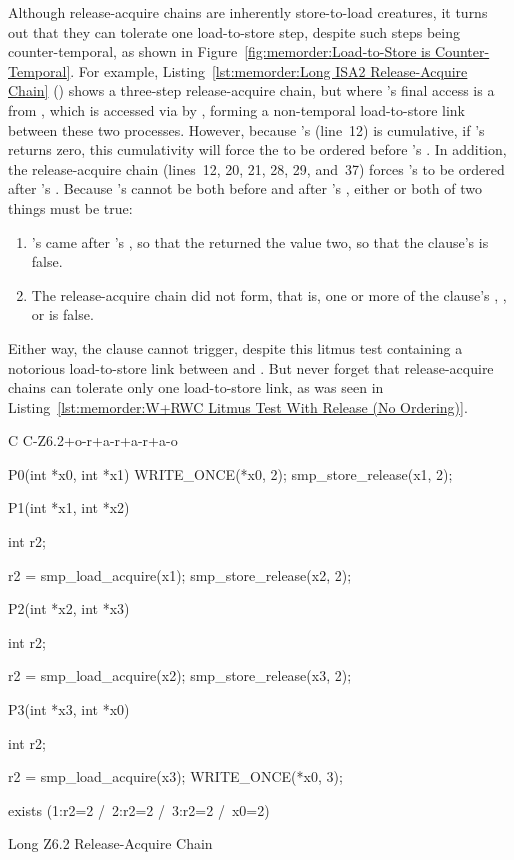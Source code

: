 Although release-acquire chains are inherently store-to-load creatures,
it turns out that they can tolerate one load-to-store step, despite
such steps being counter-temporal, as shown in
Figure~\ref{fig:memorder:Load-to-Store is Counter-Temporal}.
For example,
Listing~\ref{lst:memorder:Long ISA2 Release-Acquire Chain}
()
shows a three-step release-acquire chain, but where 's
final access is a  from , which is
accessed via  by , forming a non-temporal
load-to-store link between these two processes.
However, because 's  (line~12)
is cumulative, if 's  returns zero,
this cumulativity will force the  to be ordered
before 's .
In addition, the release-acquire chain (lines~12, 20, 21, 28, 29, and~37)
forces 's  to be ordered after 's
.
Because 's  cannot be both before and after
's , either or both of two things must
be true:

\begin{enumerate}
\item	{}'s  came after 's
	, so that the  returned
	the value two, so that the  clause's 
	is false.
\item	The release-acquire chain did not form, that is, one or more
	of the  clause's , , or 
	is false.
\end{enumerate}

Either way, the  clause cannot trigger, despite this litmus
test containing a notorious load-to-store link between
 and .
But never forget that release-acquire chains can tolerate only one
load-to-store link, as was seen in
Listing~\ref{lst:memorder:W+RWC Litmus Test With Release (No Ordering)}.

\begin{listing}[tbp]
{ \scriptsize
\begin{verbbox}[\LstLineNo]
C C-Z6.2+o-r+a-r+a-r+a-o
{
}

P0(int *x0, int *x1)
{
  WRITE_ONCE(*x0, 2);
  smp_store_release(x1, 2);
}


P1(int *x1, int *x2)
{
  int r2;

  r2 = smp_load_acquire(x1);
  smp_store_release(x2, 2);
}

P2(int *x2, int *x3)
{
  int r2;

  r2 = smp_load_acquire(x2);
  smp_store_release(x3, 2);
}

P3(int *x3, int *x0)
{
  int r2;

  r2 = smp_load_acquire(x3);
  WRITE_ONCE(*x0, 3);
}

exists (1:r2=2 /\ 2:r2=2 /\ 3:r2=2 /\ x0=2)
\end{verbbox}
}
\centering
\theverbbox
\caption{Long Z6.2 Release-Acquire Chain}
\label{lst:memorder:Long Z6.2 Release-Acquire Chain}
\end{listing}

